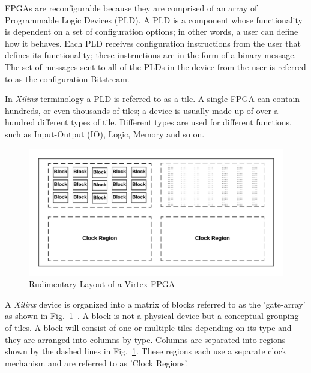 \documentclass[journal, hidelinks]{IEEEtran}
\begin{document}
FPGAs are reconfigurable because they are comprised of an array of Programmable Logic Devices (PLD).
A PLD is a component whose functionality is dependent on a set of configuration options; in other words, a user can define how it behaves.
Each PLD receives configuration instructions from the user that defines its functionality; these instructions are in the form of a binary message.
The set of messages sent to all of the PLDs in the device from the user is referred to as the configuration Bitstream.

In \textit{Xilinx} terminology a PLD is referred to as a tile. 
A single FPGA can contain hundreds, or even thousands of tiles; a device is usually made up of over a hundred different types of tile.
Different types are used for different functions, such as Input-Output (IO), Logic, Memory and so on.
\begin{figure}[h]
	\centering
	\includegraphics[width=1\linewidth]{Figures/FPGA}
	\caption[Rudimentary Layout of a Virtex FPGA]{Rudimentary Layout of a Virtex FPGA}
	\label{fig:FPGA}
\end{figure}
A \textit{Xilinx} device is organized into a matrix of blocks referred to as the 'gate-array' as shown in Fig.~\ref{fig:FPGA}~\cite{xilnxDevManual}.
A block is not a physical device but a conceptual grouping of tiles.
A block will consist of one or multiple tiles depending on its type and they are arranged into columns by type.
Columns are separated into regions shown by the dashed lines in Fig.~\ref{fig:FPGA}.
These regions each use a separate clock mechanism and are referred to as 'Clock Regions'.

\end{document}
